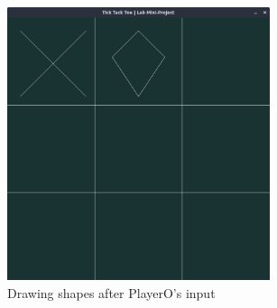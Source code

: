 \documentclass[12pt]{article}
\begin{document}
\begin{figure}[h]
    \centerline{\includegraphics[height=80mm]{userInput2.png}}
    \caption{Drawing shapes after PlayerO's input}
    \label{fig}
\end{figure}
\end{document}
